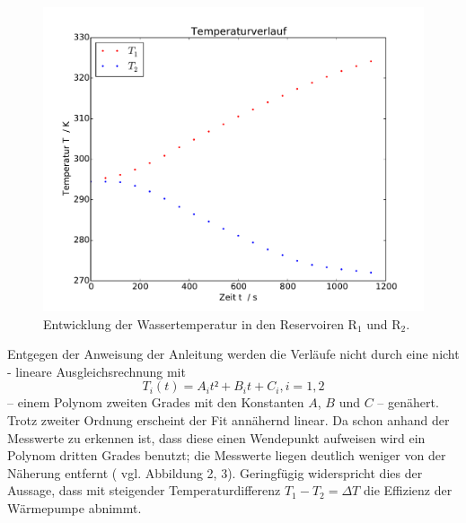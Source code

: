 \begin{figure}
\includegraphics[width=\textwidth]{Bilder/Temperaturverlauf.pdf}
	\caption{Entwicklung der Wassertemperatur in den Reservoiren $\mathup{R_1}$ und $\mathup{R_2}$.}
	\label{fig:temperaturverlauf}
\end{figure}


Entgegen der Anweisung der Anleitung werden die Verläufe nicht durch eine nicht - lineare Ausgleichsrechnung mit
\begin{equation}
	T_i(t)=A_i t² + B_i t + C_i , i=1,2
	\label{eq:t-verlauf_Grad2}
\end{equation}
 -- einem Polynom zweiten Grades mit den Konstanten $A$, $B$ und $C$ -- genähert. Trotz zweiter Ordnung erscheint der Fit annähernd linear. Da schon anhand der Messwerte zu erkennen ist, dass diese einen Wendepunkt aufweisen wird ein Polynom dritten Grades benutzt; die Messwerte liegen deutlich weniger von der Näherung entfernt ( vgl. Abbildung 2, 3). Geringfügig widerspricht dies der Aussage, dass mit steigender Temperaturdifferenz $T_1-T_2=\Delta{T}$ die Effizienz der Wärmepumpe abnimmt.

